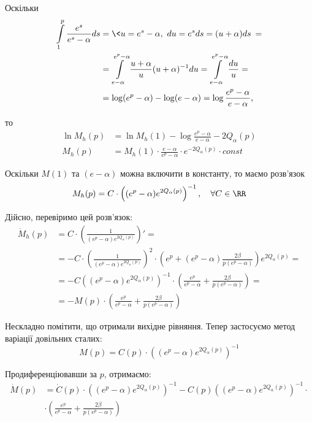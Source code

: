 Оскільки
\begin{align*}
	\int\limits_1^p \frac{e^s}{e^s - \alpha} ds &= \< u = e^s - \alpha,~ du = e^s ds = (u+\alpha) ds \> = \\
	&= \int\limits_{e-\alpha}^{e^p -\alpha} \frac{u + \alpha}{u} (u+\alpha)^{-1} du = 
	\int\limits_{e-\alpha}^{e^p -\alpha} \frac{du}{u} = \\
	&= \log(e^p - \alpha) - \log(e-\alpha) = \log \frac{e^p - \alpha}{e - \alpha} \text{,}
\end{align*}

то
\begin{align*}
	\ln{M_h (p)} &= \ln{M_h (1)} - \log \frac{e^p - \alpha}{e - \alpha} - 2Q_\alpha(p) \\
	M_h (p) &= M_h (1) \cdot \frac{e - \alpha}{e^p - \alpha} \cdot e^{- 2Q_\alpha(p)} \cdot const
\end{align*}

Оскільки $M(1)$ та $(e-\alpha)$ можна включити в константу, то маємо розв'язок
\begin{equation}
	\label{eq:uniform_right_laplace_homogen_sol}
	M_h (p) = C \cdot \left((e^p - \alpha)  e^{2Q_\alpha(p)}\right)^{-1}, \quad \forall C \in \RR
\end{equation}

Дійсно, перевіримо цей розв'язок:
\[
\begin{split}
	\dot M_h (p) &= C \cdot \left(\frac{1}{(e^p - \alpha)  e^{2Q_\alpha(p)}}\right)'=\\
	 &= - C \cdot \left(\frac{1}{(e^p - \alpha)  e^{2Q_\alpha(p)}}\right)^2 \cdot \left(e^p  + (e^p - \alpha) \frac{2\beta}{p(e^p - \alpha)}   \right) e^{2Q_\alpha(p)} =\\
	 &= -C \left((e^p - \alpha)  e^{2Q_\alpha(p)}\right)^{-1} \cdot \left(\frac{e^p}{e^p - \alpha}  + \frac{2\beta}{p(e^p - \alpha)}   \right) =\\
	 &= - M(p) \cdot \left(\frac{e^p}{e^p - \alpha}  + \frac{2\beta}{p(e^p - \alpha)}   \right)
\end{split}
\]

Нескладно помітити, що отримали вихідне рівняння. Тепер застосуємо метод варіації довільних сталих:
$$
	M(p) = C(p) \cdot \left((e^p - \alpha)  e^{2Q_\alpha(p)}\right)^{-1} 
$$

Продиференціювавши за $p$, отримаємо:
\begin{align*}
	\dot M(p) &= \dot C(p) \cdot \left((e^p - \alpha)  e^{2Q_\alpha(p)}\right)^{-1} -C(p) \left((e^p - \alpha)  e^{2Q_\alpha(p)}\right)^{-1} \cdot \\
	&\cdot \left(\frac{e^p}{e^p - \alpha}  + \frac{2\beta}{p(e^p - \alpha)}   \right) 
\end{align*}

